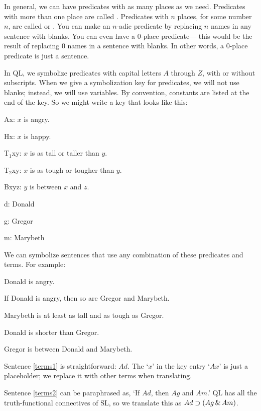 In general, we can have predicates with as many places as we need. Predicates with more than one place are called . Predicates with $n$ places, for some number $n$, are called  or . You can make an $n$-adic predicate by replacing $n$ names in any sentence with blanks. You can even have a 0-place predicate--- this would be the result of replacing $0$ names in a sentence with blanks. In other words, a 0-place predicate is just a sentence.

In QL, we symbolize predicates with capital letters $A$ through $Z$, with or without subscripts. When we give a symbolization key for predicates, we will not use blanks; instead, we will use variables. By convention, constants are listed at the end of the key. So we might write a key that looks like this:
\begin{ekey}
\item[Ax:] $x$ is angry.
\item[Hx:] $x$ is happy.
\item[T$_1$xy:] $x$ is as tall or taller than $y$.
\item[T$_2$xy:] $x$ is as tough or tougher than $y$.
\item[Bxyz:] $y$ is between $x$ and $z$.
\item[d:] Donald
\item[g:] Gregor
\item[m:] Marybeth
\end{ekey}

We can symbolize sentences that use any combination of these predicates and terms. For example:
\begin{earg}
\item[\ex{terms1}] Donald is angry.
\item[\ex{terms2}] If Donald is angry, then so are Gregor and Marybeth.
\item[\ex{terms3}] Marybeth is at least as tall and as tough as Gregor.
\item[\ex{terms4}] Donald is shorter than Gregor.
\item[\ex{terms5}] Gregor is between Donald and Marybeth.
\end{earg}

Sentence \ref{terms1} is straightforward: $Ad$. The `$x$' in the key entry `$Ax$' is just a placeholder; we replace it with other terms when translating.

Sentence \ref{terms2} can be paraphrased as, `If $Ad$, then $Ag$ and $Am$.' QL has all the truth-functional connectives of SL, so we translate this as $Ad \supset (Ag \,\&\, Am)$.

